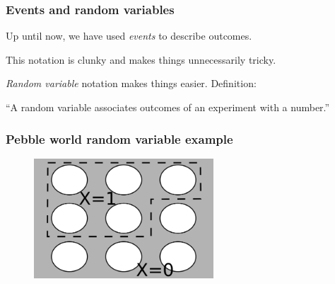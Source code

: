\documentclass{beamer}
\begin{document}
	\begin{frame}
		\frametitle{Events and random variables}
		Up until now, we have used \textit{events} to describe outcomes.
		
		\vspace{0.5cm}
		
		This notation is clunky and makes things unnecessarily tricky.
		
		\vspace{0.5cm}
		
		\textit{Random variable} notation makes things easier. Definition:
		
		``A random variable associates outcomes of an experiment with a number.''
		
	\end{frame}
	
	\begin{frame}
		\frametitle{Pebble world random variable example}
		
		\begin{figure}[ht]
			\includegraphics[width=0.6\textwidth]{./figures/pebble_world_rvs.png}
		\end{figure}
		
	\end{frame}
	
\end{document}
